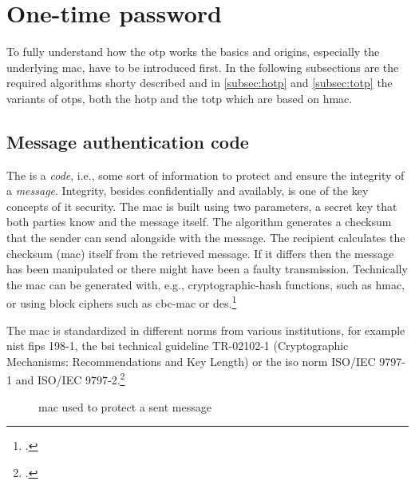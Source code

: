 \section{One-time password}

To fully understand how the \gls{otp} works the basics and origins, especially the underlying \gls{mac}, have to be introduced first. In the following subsections are the required algorithms shorty described and in \autoref{subsec:hotp} and \autoref{subsec:totp} the variants of \glspl{otp}, both the \gls{hotp} and the \gls{totp} which are based on \gls{hmac}.

\newpage

\subsection{Message authentication code}

The  is a \textit{code}, i.e., some sort of information to protect and ensure the integrity of a \textit{message}. Integrity, besides confidentially and availably, is one of the key concepts of \gls{it} security. The \gls{mac} is built using two parameters, a secret key that both parties know and the message itself. The algorithm generates a checksum that the sender can send alongside with the message. The recipient calculates the checksum (\gls{mac}) itself from the retrieved message. If it differs then the message has been manipulated or there might have been a faulty transmission. Technically the \gls{mac} can be generated with, e.g., cryptographic-hash functions, such as \gls{hmac}, or using block ciphers such as \gls{cbc-mac} or \gls{des}.\footcites[See][565]{320284}[See][163--168]{anderson2008security}[See][391--393]{eckert-it-sec-9}

The \gls{mac} is standardized in different norms from various institutions, for example \gls{nist} \gls{fips} 198-1, the \gls{bsi} technical guideline TR-02102-1 (\frqq Cryptographic Mechanisms: Recommendations and Key Length\flqq{}) or the \gls{iso} norm ISO/IEC 9797-1 and ISO/IEC 9797-2.\footcites[See][]{FIPS198}[See][]{bsi2019recommendations}[See][]{iso9797-1}[See][]{iso9797-2}

\newpage

\begin{figure}[hbt]
	\centering
	
	\caption[\Glsdesc{mac} used to protect a sent message]{\Glsdesc{mac} used to protect a sent message\footnotemark}
	\label{fig:mac}
\end{figure}

